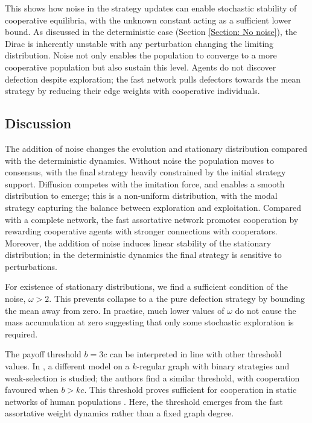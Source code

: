 \documentclass[10pt]{article}
\begin{document}
This shows how noise in the strategy updates can enable stochastic stability of cooperative equilibria, with the unknown constant acting as a sufficient lower bound. As discussed in the deterministic case (Section \ref{Section: No noise}), the Dirac is inherently unstable with any perturbation changing the limiting distribution. Noise not only enables the population to converge to a more cooperative population but also sustain this level. Agents do not discover defection despite exploration; the fast network pulls defectors towards the mean strategy by reducing their edge weights with cooperative individuals.

\subsection{Discussion}

The addition of noise changes the evolution and stationary distribution compared with the deterministic dynamics. Without noise the population moves to consensus, with the final strategy heavily constrained by the initial strategy support. Diffusion competes with the imitation force, and enables a smooth distribution to emerge; this is a non-uniform distribution, with the modal strategy capturing the balance between exploration and exploitation. Compared with a complete network, the fast assortative network promotes cooperation by rewarding cooperative agents with stronger connections with cooperators. Moreover, the addition of noise induces linear stability of the stationary distribution; in the deterministic dynamics the final strategy is sensitive to perturbations.

For existence of stationary distributions, we find a sufficient condition of the noise, $\omega>2$. This prevents collapse to a the pure defection strategy by bounding the mean away from zero. In practise, much lower values of $\omega$ do not cause the mass accumulation at zero suggesting that only some stochastic exploration is required.

The payoff threshold $b=3c$ can be interpreted in line with other threshold values. In \cite{ohtsuki_simple_2006}, a different model on a $k$-regular graph with binary strategies and weak-selection is studied; the authors find a similar threshold, with cooperation  favoured when $b>kc$. This threshold proves sufficient for cooperation in static networks of human populations \cite{rand_static_2014}. Here, the threshold emerges from the fast assortative weight dynamics rather than a fixed graph degree. 
\end{document}
